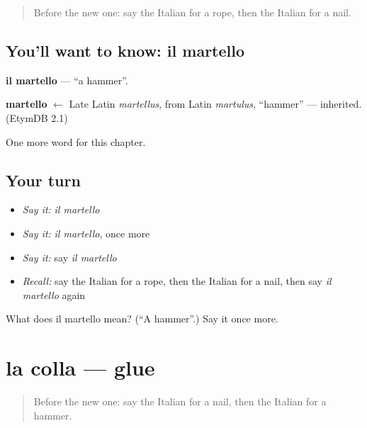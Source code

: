 \label{lesson:IT-C99-martello}



\begin{quote}
Before the new one: say the Italian for a rope, then the Italian for a nail.
\end{quote}

\subsection*{You'll want to know: il martello}
\textbf{il martello} — \textquotedblleft{}a hammer\textquotedblright{}.

\begin{cousinweb}
\textbf{martello} $\leftarrow$ Late Latin \emph{martellus}, from Latin \emph{martulus}, \textquotedblleft{}hammer\textquotedblright{} — inherited. (EtymDB 2.1)
\end{cousinweb}

\begin{grammarlens}[title={What you've built}]
One more word for this chapter.
\end{grammarlens}

\subsection*{Your turn}
\begin{itemize}
\raggedright
  \item \emph{Say it:} \emph{il martello}
  \item \emph{Say it:} \emph{il martello}, once more
  \item \emph{Say it:} say \emph{il martello}
  \item \emph{Recall:} say the Italian for a rope, then the Italian for a nail, then say \emph{il martello} again
\end{itemize}

\begin{tcolorbox}[breakable,colback=teal!4,colframe=teal!35!black,title={Before you move on}]
What does il martello mean? (\textquotedblleft{}A hammer\textquotedblright{}.) Say it once more.
\end{tcolorbox}
\section[la colla]{la colla — glue}

\label{lesson:IT-C99-colla}



\begin{quote}
Before the new one: say the Italian for a nail, then the Italian for a hammer.
\end{quote}

